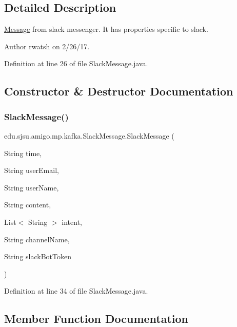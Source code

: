 \subsection{Detailed Description}
\hyperlink{classedu_1_1sjsu_1_1amigo_1_1mp_1_1kafka_1_1_message}{Message} from slack messenger. It has properties specific to slack.

\begin{DoxyAuthor}{Author}
rwatsh on 2/26/17. 
\end{DoxyAuthor}


Definition at line 26 of file Slack\+Message.\+java.



\subsection{Constructor \& Destructor Documentation}
\mbox{\label{classedu_1_1sjsu_1_1amigo_1_1mp_1_1kafka_1_1_slack_message_a706d258edc75e14aa115bfcc23a7e1eb}} 
\subsubsection{\texorpdfstring{Slack\+Message()}{SlackMessage()}}
{\footnotesize\ttfamily edu.\+sjsu.\+amigo.\+mp.\+kafka.\+Slack\+Message.\+Slack\+Message (\begin{DoxyParamCaption}\item[{String}]{time,  }\item[{String}]{user\+Email,  }\item[{String}]{user\+Name,  }\item[{String}]{content,  }\item[{List$<$ String $>$}]{intent,  }\item[{String}]{channel\+Name,  }\item[{String}]{slack\+Bot\+Token }\end{DoxyParamCaption})}



Definition at line 34 of file Slack\+Message.\+java.



\subsection{Member Function Documentation}
\mbox{\label{classedu_1_1sjsu_1_1amigo_1_1mp_1_1kafka_1_1_slack_message_ad0f8198c748b38249b90d29398e494fe}} 
